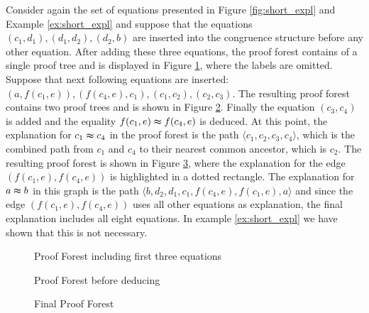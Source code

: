 \begin{example}

Consider again the set of equations presented in Figure \ref{fig:short_expl} and Example \ref{ex:short_expl} and suppose that the equations $(c_1,d_1),(d_1,d_2),(d_2,b)$ are inserted into the congruence structure before any other equation.
After adding these three equations, the proof forest contains of a single proof tree and is displayed in Figure \ref{fig:proof_forest_1}, where the labels are omitted.
Suppose that next following equations are inserted: $(a,f(c_1,e)),(f(c_4,e),c_1),(c_1,c_2),(c_2,c_3)$.
The resulting proof forest contains two proof trees and is shown in Figure \ref{fig:proof_forest_2}.
Finally the equation $(c_3,c_4)$ is added and the equality $f(c_1,e) \thickapprox f(c_4,e)$ is deduced.
At this point, the explanation for $c_1 \thickapprox c_4$ in the proof forest is the path $\langle c_1,c_2,c_3,c_4 \rangle$, which is the combined path from $c_1$ and $c_4$ to their nearest common ancestor, which is $c_2$.
The resulting proof forest is shown in Figure \ref{fig:proof_forest_3}, where the explanation for the edge $(f(c_1,e),f(c_4,e))$ is highlighted in a dotted rectangle.
The explanation for $a \thickapprox b$ in this graph is the path $\langle b,d_2,d_1,c_1,f(c_4,e),f(c_1,e),a\rangle$ and since the edge $(f(c_1,e),f(c_4,e))$ uses all other equations as explanation, the final explanation includes all eight equations.
In example \ref{ex:short_expl} we have shown that this is not necessary.

\begin{figure}[!h]

\caption{Proof Forest including first three equations}
\label{fig:proof_forest_1}
\end{figure}

\begin{figure}[!h]

\caption{Proof Forest before deducing}
\label{fig:proof_forest_2}
\end{figure}

\begin{figure}[!h]

\caption{Final Proof Forest}
\label{fig:proof_forest_3}
\end{figure}

\end{example}


\FloatBarrier